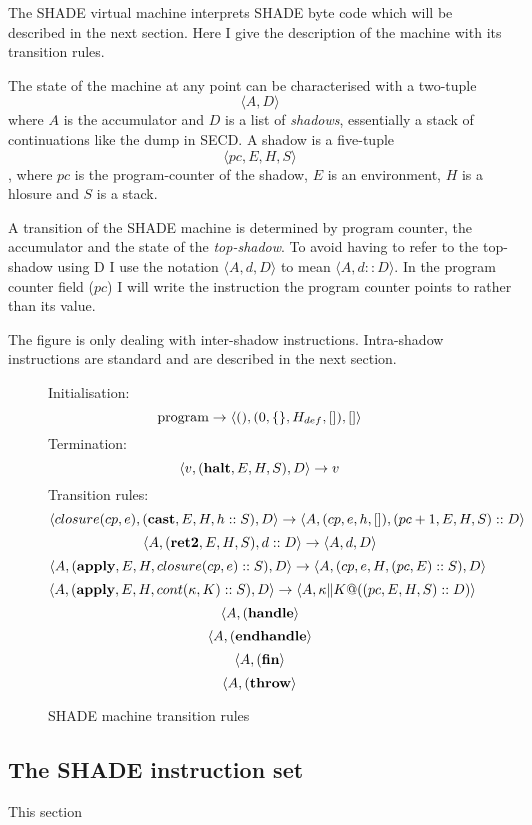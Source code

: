 \documentclass[class=article, crop=false]{standalone}
\begin{document}
The SHADE virtual machine interprets SHADE byte code which will be described
in the next section. Here I give the description of the machine with its transition
rules.

The state of the machine at any point can be characterised with a two-tuple
$$ \langle A, D \rangle $$
where $A$ is the accumulator and $D$ is a list of \emph{shadows}, essentially a stack
of continuations like the dump in SECD.
A shadow is a five-tuple $$ \langle pc, E, H, S \rangle $$, where $pc$ is the
program-counter of the shadow, $E$ is an environment, $H$ is a hlosure and $S$ is
a stack.

A transition of the SHADE machine is determined by program counter, the accumulator
and the state of the \emph{top-shadow}. To avoid having to refer to the top-shadow
using D I use the notation $\langle A, d, D \rangle$ to mean $\langle A, d :: D \rangle$.
In the program counter field ($pc$) I will write the instruction the program counter
points to rather than its value.

The figure is only dealing with inter-shadow instructions. Intra-shadow instructions
are standard and are described in the next section.

\begin{figure}
    Initialisation:
    $$\text{program} \to \langle \mathbf{()}, (0, \{\}, H_{def}, []), [] \rangle$$
    Termination:
    $$ \langle v, (\mathbf{halt}, E, H, S), D \rangle \to v $$
    Transition rules:
    $$ \langle closure(cp, e), (\mathbf{cast}, E, H, h :: S), D \rangle \to \langle A, (cp, e, h, []), (pc+1, E, H, S) :: D \rangle $$
    $$ \langle A, (\mathbf{ret2}, E, H, S), d :: D \rangle \to \langle A, d, D \rangle $$
    $$ \langle A, (\mathbf{apply}, E, H, closure(cp, e) :: S), D \rangle \to \langle A, (cp, e, H, (pc, E) :: S), D \rangle $$
    $$ \langle A, (\mathbf{apply}, E, H, cont (\kappa, K) :: S), D \rangle \to \langle A, \kappa \| K @ ((pc, E, H, S) :: D) \rangle $$
    $$ \langle A, (\mathbf{handle} \rangle $$
    $$ \langle A, (\mathbf{endhandle} \rangle $$
    $$ \langle A, (\mathbf{fin} \rangle $$
    $$ \langle A, (\mathbf{throw} \rangle $$

    \caption{SHADE machine transition rules}
    \label{shade-machine}
\end{figure}

\subsection{The SHADE instruction set}

This section
\end{document}
